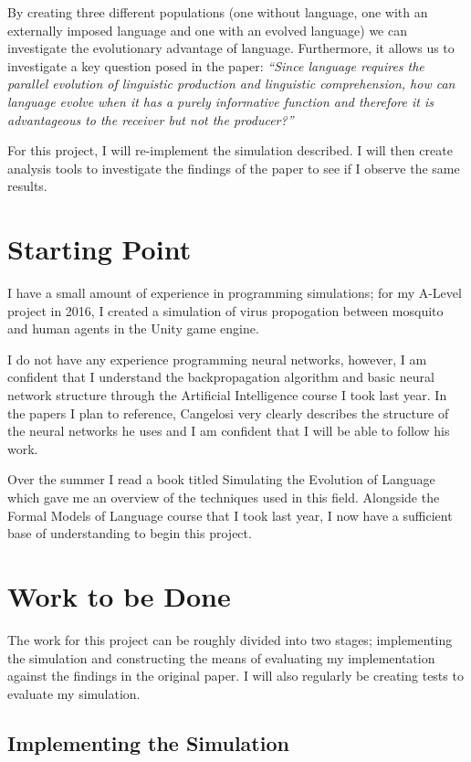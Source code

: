 \documentclass[12pt]{article}
\begin{document}
By creating three different populations (one without language, one with an externally imposed language and one with an evolved language) we can investigate the evolutionary advantage of language. Furthermore, it allows us to investigate a key question posed in the paper: \emph{``Since language requires the parallel evolution of linguistic production and linguistic comprehension, how can language evolve when it has a purely informative function and therefore it is advantageous to the receiver but not the producer?''}

For this project, I will re-implement the simulation described. I will then create analysis tools to investigate the findings of the paper to see if I observe the same results.

\section*{Starting Point}

I have a small amount of experience in programming simulations; for my A-Level project in 2016, I created a simulation of virus propogation between mosquito and human agents in the Unity game engine.

I do not have any experience programming neural networks, however, I am confident that I understand the backpropagation algorithm and basic neural network structure through the Artificial Intelligence course I took last year. In the papers I plan to reference, Cangelosi very clearly describes the structure of the neural networks he uses and I am confident that I will be able to follow his work.

Over the summer I read a book titled Simulating the Evolution of Language which gave me an overview of the techniques used in this field. Alongside the Formal Models of Language course that I took last year, I now have a sufficient base of understanding to begin this project.

\section*{Work to be Done}

The work for this project can be roughly divided into two stages; implementing the simulation and constructing the means of evaluating my implementation against the findings in the original paper. I will also regularly be creating tests to evaluate my simulation.

\subsection*{Implementing the Simulation}
\end{document}
